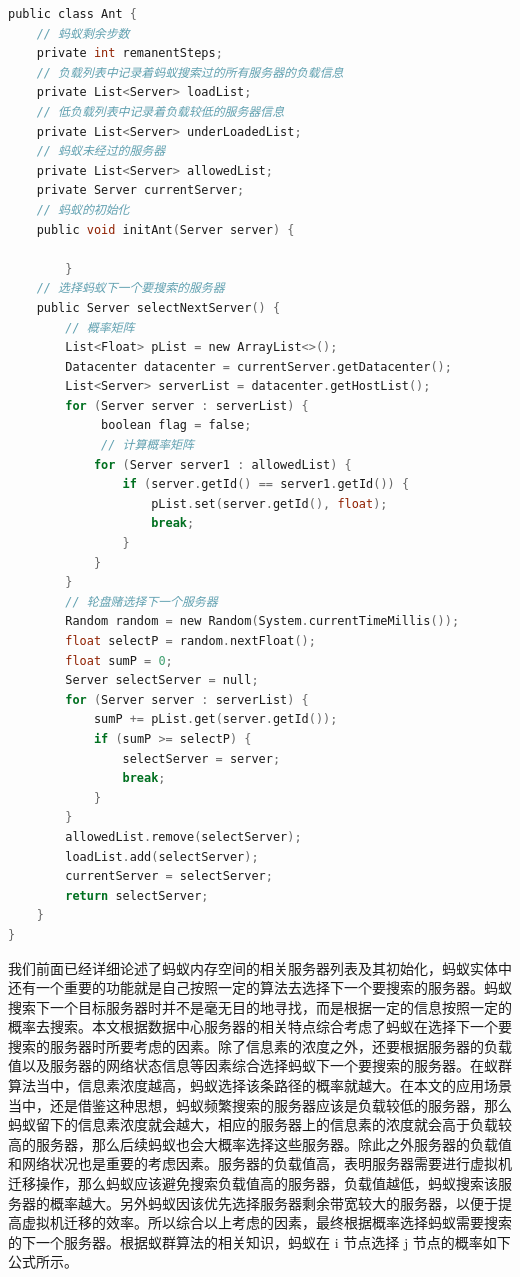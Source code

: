 \begin{lstlisting}[language=C,caption={蚂蚁实体},label=Code:java]
public class Ant {
    // 蚂蚁剩余步数
    private int remanentSteps;
    // 负载列表中记录着蚂蚁搜索过的所有服务器的负载信息
    private List<Server> loadList;
    // 低负载列表中记录着负载较低的服务器信息
    private List<Server> underLoadedList;
    // 蚂蚁未经过的服务器
    private List<Server> allowedList;
    private Server currentServer;
    // 蚂蚁的初始化
    public void initAnt(Server server) {
            
        }
    // 选择蚂蚁下一个要搜索的服务器
    public Server selectNextServer() {
        // 概率矩阵
        List<Float> pList = new ArrayList<>();
        Datacenter datacenter = currentServer.getDatacenter();
        List<Server> serverList = datacenter.getHostList();
        for (Server server : serverList) {
             boolean flag = false;
             // 计算概率矩阵
            for (Server server1 : allowedList) {
                if (server.getId() == server1.getId()) {
                    pList.set(server.getId(), float);
                    break;
                }
            }
        }
        // 轮盘赌选择下一个服务器
        Random random = new Random(System.currentTimeMillis());
        float selectP = random.nextFloat();
        float sumP = 0;
        Server selectServer = null;
        for (Server server : serverList) {
            sumP += pList.get(server.getId());
            if (sumP >= selectP) {
                selectServer = server;
                break;
            }
        }
        allowedList.remove(selectServer);
        loadList.add(selectServer);
        currentServer = selectServer;
        return selectServer;
    }
}
\end{lstlisting}

我们前面已经详细论述了蚂蚁内存空间的相关服务器列表及其初始化，蚂蚁实体中还有一个重要的功能就是自己按照一定的算法去选择下一个要搜索的服务器。蚂蚁搜索下一个目标服务器时并不是毫无目的地寻找，而是根据一定的信息按照一定的概率去搜索。本文根据数据中心服务器的相关特点综合考虑了蚂蚁在选择下一个要搜索的服务器时所要考虑的因素。除了信息素的浓度之外，还要根据服务器的负载值以及服务器的网络状态信息等因素综合选择蚂蚁下一个要搜索的服务器。在蚁群算法当中，信息素浓度越高，蚂蚁选择该条路径的概率就越大。在本文的应用场景当中，还是借鉴这种思想，蚂蚁频繁搜索的服务器应该是负载较低的服务器，那么蚂蚁留下的信息素浓度就会越大，相应的服务器上的信息素的浓度就会高于负载较高的服务器，那么后续蚂蚁也会大概率选择这些服务器。除此之外服务器的负载值和网络状况也是重要的考虑因素。服务器的负载值高，表明服务器需要进行虚拟机迁移操作，那么蚂蚁应该避免搜索负载值高的服务器，负载值越低，蚂蚁搜索该服务器的概率越大。另外蚂蚁因该优先选择服务器剩余带宽较大的服务器，以便于提高虚拟机迁移的效率。所以综合以上考虑的因素，最终根据概率选择蚂蚁需要搜索的下一个服务器。根据蚁群算法的相关知识，蚂蚁在 i 节点选择 j 节点的概率如下公式所示。

